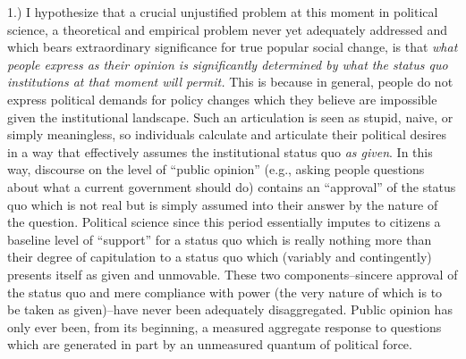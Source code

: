 \documentclass[12pt,book]{article}
\begin{document}
1.) I hypothesize that a crucial unjustified problem at this moment in
political science, a theoretical and empirical problem never yet
adequately addressed and which bears extraordinary significance for true
popular social change, is that \emph{what people express as their
opinion is significantly determined by what the status quo institutions
at that moment will permit.} This is because in general, people do not
express political demands for policy changes which they believe are
impossible given the institutional landscape. Such an articulation is
seen as stupid, naive, or simply meaningless, so individuals calculate
and articulate their political desires in a way that effectively assumes
the institutional status quo \emph{as given}. In this way, discourse on
the level of ``public opinion'' (e.g., asking people questions about
what a current government should do) contains an ``approval'' of the
status quo which is not real but is simply assumed into their answer by
the nature of the question. Political science since this period
essentially imputes to citizens a baseline level of ``support'' for a
status quo which is really nothing more than their degree of
capitulation to a status quo which (variably and contingently) presents
itself as given and unmovable. These two components--sincere approval of
the status quo and mere compliance with power (the very nature of which
is to be taken as given)--have never been adequately disaggregated.
Public opinion has only ever been, from its beginning, a measured
aggregate response to questions which are generated in part by an
unmeasured quantum of political force.
\end{document}
